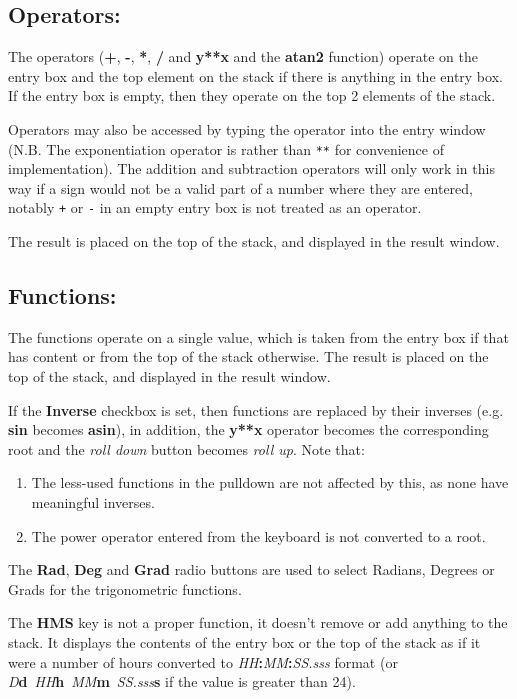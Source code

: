 \documentclass{article}
\begin{document}
  \subsection{Operators:}

  The operators (\textbf{+}, \textbf{-}, \textbf{*}, \textbf{/} and
  \textbf{y**x} and the \textbf{atan2} function) operate on the entry
  box and the top element on the stack if there is anything in the
  entry box. If the entry box is empty, then they operate on the top 2
  elements of the stack.

  Operators may also be accessed by typing the operator into the entry
  window (N.B. The exponentiation operator is \texttt{\Circum} rather than
  \texttt{**} for convenience of implementation). The addition and
  subtraction operators will only work in this way if a sign would not
  be a valid part of a number where they are entered, notably
  \texttt{+} or \texttt{-} in an empty entry box is not treated as an
  operator.

  The result is placed on the top of the stack, and displayed in the
  result window.

  \subsection{Functions:}

  The functions operate on a single value, which is taken from the
  entry box if that has content or from the top of the stack
  otherwise. The result is placed on the top of the stack, and
  displayed in the result window.

  If the \textbf{Inverse} checkbox is set, then functions are replaced
  by their inverses (e.g. \textbf{sin} becomes \textbf{asin}), in
  addition, the \textbf{y**x} operator becomes the
  corresponding root and the
  \emph{roll down} button becomes \emph{roll up}. Note that:
  \begin{enumerate}
  \item The less-used functions in the pulldown are not affected by
    this, as none have meaningful inverses.
  \item The power operator \textbf{\Circum} entered from the keyboard is not
    converted to a root.
  \end{enumerate}

  The \textbf{Rad}, \textbf{Deg} and \textbf{Grad} radio buttons are
  used to select Radians, Degrees or Grads for the trigonometric
  functions.

  The \textbf{HMS} key is not a proper function, it doesn't remove or
  add anything to the stack. It displays the contents of the entry box
  or the top of the stack as if it were a number of hours converted to
  \emph{HH}\textbf{:}\emph{MM}\textbf{:}\emph{SS.sss} format (or
  \emph{D}\textbf{d}~\emph{HH}\textbf{h}~\emph{MM}\textbf{m}~\emph{SS.sss}\textbf{s}
  if the value is greater than 24).
\end{document}
